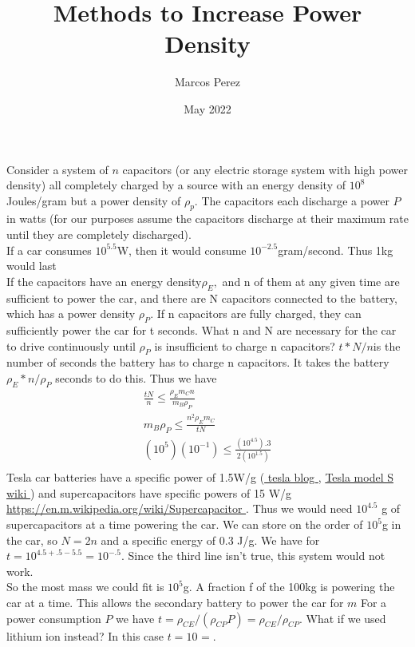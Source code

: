 \documentclass[12pt]{article}
\title{Methods to Increase Power Density}
\author{Marcos Perez}
\date{May 2022}
\begin{document}
\maketitle
Consider a system of $n$ capacitors (or any electric storage system with high power density) all completely charged by a source with an energy density of $10^8$Joules/gram but a power density of $\rho_p$. The capacitors each discharge a power $P$ in watts (for our purposes assume the capacitors discharge at their maximum rate until they are completely discharged).\\
If a car consumes $10^5.5$W, then it would consume $10^{-2.5}$gram/second. Thus 1kg would last \\
If the capacitors have an energy density$ \rho_E,$ and n of them at any given time are sufficient to power the car, and there are N capacitors connected to the battery, which has a power density $\rho_P$. 
If n capacitors are fully charged, they can sufficiently power the car for t seconds.
What n and N are necessary for the car to drive continuously until $\rho_P$ is insufficient to charge n capacitors?
$t * N / n $is the number of seconds the battery has to charge n capacitors. It takes the battery $\rho_E * n / \rho_P$ seconds to do this. Thus we have
\begin{equation}
\begin{split}
    \frac{tN}{n} \le \frac{\rho_Em_Cn}{m_B \rho_P} \\
    m_B\rho_P \le \frac{n^2\rho_Em_C}{tN}\\
    (10^5)(10^{-1}) \le \frac{(10^{4.5}).3}{2(10^{1.5})}  \\
\end{split}
\end{equation}
Tesla car batteries have a specific power of 1.5W/g
(\href{
https://www.tesla.com/pt_PT/blog/bit-about-batteries
}{
tesla blog
},
\href{
https://en.m.wikipedia.org/wiki/Tesla_Model_S
}{
Tesla model S wiki
}) and supercapacitors have specific powers of 15 W/g \href{
https://en.m.wikipedia.org/wiki/Supercapacitor
}{
https://en.m.wikipedia.org/wiki/Supercapacitor
}. Thus we would need $10^{4.5}$ g of supercapacitors at a time 
powering the car. We can store on the order of $10^5$g in the car, 
so $N=2n$ and a specific energy of 0.3 J/g. We have for $t = 10^{4.5+.5-5.5} = 10^{-.5}$. Since the third line isn't true, this
system would not work. \\
So the most mass we could fit is $10^5$g. A fraction f of the 100kg is powering the car at a time. This allows the secondary battery to power the car for $m $
For a power consumption $P$ we have $t=\rho_{CE}/(\rho_{CP}P) = \rho_{CE}/\rho_{CP}$. 
What if we used lithium ion instead? In this case $t = 10^{} = $. 
\end{document}

